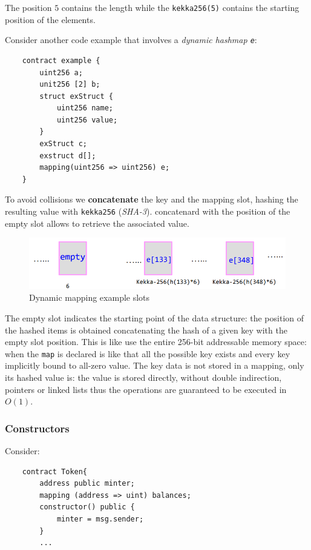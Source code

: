 \documentclass[10pt,a4paper]{report}
\begin{document}
The position $5$ contains the length while the \texttt{kekka256(5)} contains the starting position of the elements.

Consider another code example that involves a \textit{dynamic hashmap \texttt{e}}:
\begin{lstlisting}
	contract example { 
		uint256 a; 
		unit256 [2] b; 
		struct exStruct { 
			uint256 name; 
			uint256 value;
		} 
		exStruct c; 
		exstruct d[];
		mapping(uint256 => uint256) e;
	}
\end{lstlisting}

To avoid collisions we \textbf{concatenate} the key and the mapping slot, hashing the resulting value with \texttt{kekka256} (\textit{SHA-3}).
concatenard with the position of the empty slot allows to retrieve  the associated value.
\begin{figure}[h]
	\centering
	\includegraphics[scale=0.50]{images/Pasted image 20230424103523.png}
	\caption{Dynamic mapping example slots}
\end{figure}

The empty slot indicates the starting point of the data structure: the position of the hashed items is obtained concatenating the hash of a given key with the empty slot position.
This is like use the entire 256-bit addressable memory space: when the \texttt{map} is declared is like that all the possible key exists and every key implicitly bound to all-zero value.
The key data is not stored in a mapping, only its hashed value is: the value is stored directly, without double indirection, pointers or linked lists thus the operations are guaranteed to be executed in $O(1)$.
\subsubsection{Constructors}\label{sec:constructors}
Consider:
\begin{lstlisting}
	contract Token{
		address public minter;
		mapping (address => uint) balances;
		constructor() public {
			minter = msg.sender;
		}
		...
	\end{lstlisting}
	
\end{document}
